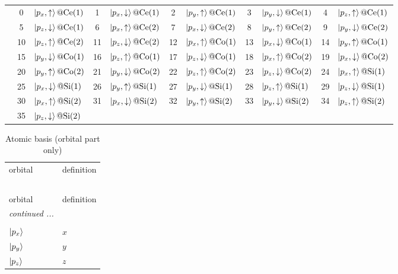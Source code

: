 \documentclass[fleqn,10pt,landscape]{jsarticle}
\begin{document}
\begin{longtable}[l]{c|cl|cl|cl|cl|cl}
 & 0 & $\ket{p_{x},\uparrow}@{\rm Ce}(1)$ & 1 & $\ket{p_{x},\downarrow}@{\rm Ce}(1)$ & 2 & $\ket{p_{y},\uparrow}@{\rm Ce}(1)$ & 3 & $\ket{p_{y},\downarrow}@{\rm Ce}(1)$ & 4 & $\ket{p_{z},\uparrow}@{\rm Ce}(1)$ \\
& 5 & $\ket{p_{z},\downarrow}@{\rm Ce}(1)$ & 6 & $\ket{p_{x},\uparrow}@{\rm Ce}(2)$ & 7 & $\ket{p_{x},\downarrow}@{\rm Ce}(2)$ & 8 & $\ket{p_{y},\uparrow}@{\rm Ce}(2)$ & 9 & $\ket{p_{y},\downarrow}@{\rm Ce}(2)$ \\
& 10 & $\ket{p_{z},\uparrow}@{\rm Ce}(2)$ & 11 & $\ket{p_{z},\downarrow}@{\rm Ce}(2)$ & 12 & $\ket{p_{x},\uparrow}@{\rm Co}(1)$ & 13 & $\ket{p_{x},\downarrow}@{\rm Co}(1)$ & 14 & $\ket{p_{y},\uparrow}@{\rm Co}(1)$ \\
& 15 & $\ket{p_{y},\downarrow}@{\rm Co}(1)$ & 16 & $\ket{p_{z},\uparrow}@{\rm Co}(1)$ & 17 & $\ket{p_{z},\downarrow}@{\rm Co}(1)$ & 18 & $\ket{p_{x},\uparrow}@{\rm Co}(2)$ & 19 & $\ket{p_{x},\downarrow}@{\rm Co}(2)$ \\
& 20 & $\ket{p_{y},\uparrow}@{\rm Co}(2)$ & 21 & $\ket{p_{y},\downarrow}@{\rm Co}(2)$ & 22 & $\ket{p_{z},\uparrow}@{\rm Co}(2)$ & 23 & $\ket{p_{z},\downarrow}@{\rm Co}(2)$ & 24 & $\ket{p_{x},\uparrow}@{\rm Si}(1)$ \\
& 25 & $\ket{p_{x},\downarrow}@{\rm Si}(1)$ & 26 & $\ket{p_{y},\uparrow}@{\rm Si}(1)$ & 27 & $\ket{p_{y},\downarrow}@{\rm Si}(1)$ & 28 & $\ket{p_{z},\uparrow}@{\rm Si}(1)$ & 29 & $\ket{p_{z},\downarrow}@{\rm Si}(1)$ \\
& 30 & $\ket{p_{x},\uparrow}@{\rm Si}(2)$ & 31 & $\ket{p_{x},\downarrow}@{\rm Si}(2)$ & 32 & $\ket{p_{y},\uparrow}@{\rm Si}(2)$ & 33 & $\ket{p_{y},\downarrow}@{\rm Si}(2)$ & 34 & $\ket{p_{z},\uparrow}@{\rm Si}(2)$ \\
& 35 & $\ket{p_{z},\downarrow}@{\rm Si}(2)$ &  &  &  &  &  &  &  &  \\
\end{longtable}
\renewcommand{\arraystretch}{1.6}
\begin{longtable}[l]{ll}
\captionsetup{justification=raggedright, singlelinecheck=off}
\caption{Atomic basis (orbital part only)}
 \\
 \hline \hline
orbital & definition \\ \hline \endfirsthead

\multicolumn{1}{l}{\tablename\ \thetable{}} \\
 \hline \hline
orbital & definition \\ \hline \endhead

 \hline \hline
\multicolumn{1}{r}{\footnotesize\it continued ...} \\ \endfoot

 \hline \hline
\multicolumn{1}{r}{} \\ \endlastfoot

$ \ket{p_{x}} $ & $ x $ \\
$ \ket{p_{y}} $ & $ y $ \\
$ \ket{p_{z}} $ & $ z $ \\
\end{longtable}
\end{document}
